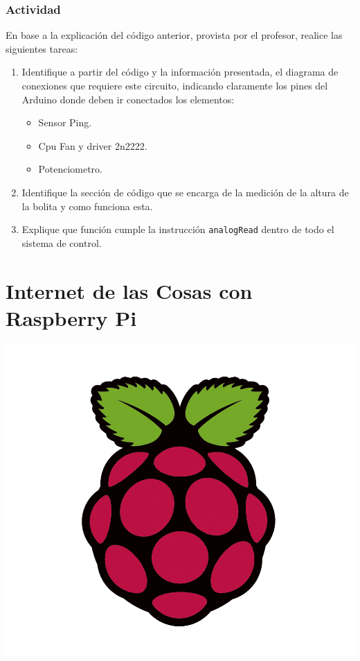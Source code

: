 \documentclass[letterpaper, 10pt]{report}
\begin{document}
\subsection{Actividad}

En base a la explicación del código anterior, provista por el profesor, realice las siguientes tareas:

\begin{enumerate}
	\item Identifique a partir del código y la información presentada, el diagrama de conexiones que requiere este circuito, indicando claramente los pines del Arduino donde deben ir conectados los elementos:
	\begin{itemize}
		\item Sensor Ping.
		\item Cpu Fan y driver 2n2222.
		\item Potenciometro.
	\end{itemize}
	
	\item Identifique la sección de código que se encarga de la medición de la altura de la bolita y como funciona esta.
	
	\item Explique que función cumple la instrucción \texttt{analogRead} dentro de todo el sistema de control.
\end{enumerate} 


\chapter{Internet de las Cosas con Raspberry Pi}

\begin{center}
\includegraphics[scale=0.15]{logoRaspberry.png}
\end{center}
\end{document}
